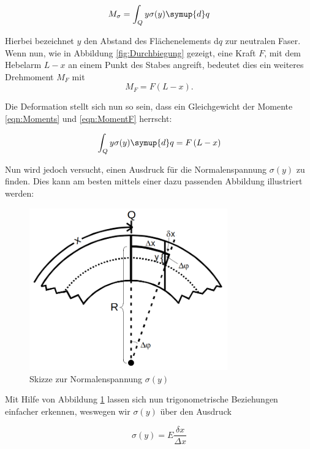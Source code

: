 \begin{equation}
\label{eqn:Moments}
    M_\sigma = \int_Q y\sigma(y)\symup{d}q 
\end{equation}

\noindent Hierbei bezeichnet $y$ den Abstand des Flächenelements d$q$ zur neutralen Faser.\\
Wenn nun, wie in Abbildung \ref{fig:Durchbiegung} gezeigt, eine Kraft $F$, mit dem Hebelarm $L-x$ an einem Punkt des Stabes angreift, bedeutet dies
ein weiteres Drehmoment $M_F$ mit
\begin{equation}
\label{eqn:MomentF}
    M_F = F\left(L-x\right).
\end{equation}

\noindent Die Deformation stellt sich nun so sein, dass ein Gleichgewicht der Momente \eqref{eqn:Moments} und \eqref{eqn:MomentF} herrscht:

\begin{equation}
\label{eqn:Moment1}
    \int_Q y\sigma(y)\symup{d}q =F\left(L-x\right)
\end{equation}

\noindent Nun wird jedoch versucht, einen Ausdruck für die Normalenspannung $\sigma(y)$ zu finden. Dies kann am besten mittels
einer dazu passenden Abbildung illustriert werden:

\begin{figure}
    \centering
    \includegraphics[height=7cm]{Trigonometrie.png}
    \caption{Skizze zur Normalenspannung $\sigma(y)$}
    \label{fig:Trigonometrie}
\end{figure}

\noindent Mit Hilfe von Abbildung \ref{fig:Trigonometrie} lassen sich nun trigonometrische Beziehungen einfacher erkennen, weswegen
wir $\sigma(y)$ über den Ausdruck

\begin{equation}
\label{eqn:Normalenspannung}
    \sigma(y) = E\frac{\delta x}{\Delta x}
\end{equation}

